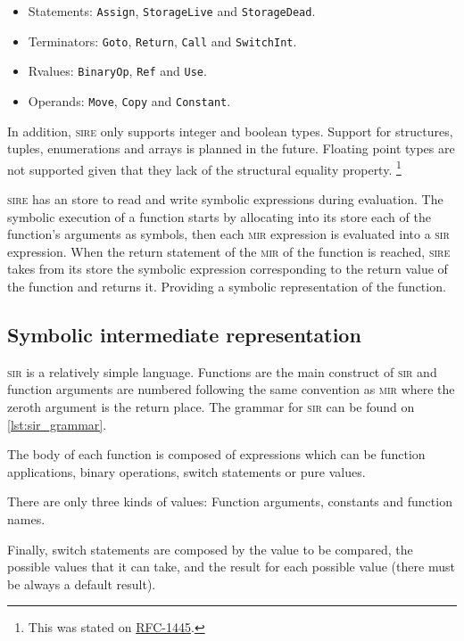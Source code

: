 \begin{itemize}
    \item Statements: \texttt{Assign}, \texttt{StorageLive} and \texttt{StorageDead}.
    \item Terminators: \texttt{Goto}, \texttt{Return}, \texttt{Call} and \texttt{SwitchInt}.
    \item Rvalues: \texttt{BinaryOp}, \texttt{Ref} and \texttt{Use}.
    \item Operands: \texttt{Move}, \texttt{Copy} and \texttt{Constant}.
\end{itemize}

In addition, \textsc{sire} only supports integer and boolean types. Support for
structures, tuples, enumerations and arrays is planned in the future. Floating
point types are not supported given that they lack of the structural equality
property. \footnote{This was stated on
\href{https://github.com/rust-lang/rfcs/blob/master/text/1445-restrict-constants-in-patterns.md}{RFC-1445}.}

\textsc{sire} has an store to read and write symbolic expressions during
evaluation. The symbolic execution of a function starts by allocating into its
store each of the function's arguments as symbols, then each \textsc{mir}
expression is evaluated into a \textsc{sir} expression. When the return
statement of the \textsc{mir} of the function is reached, \textsc{sire} takes
from its store the symbolic expression corresponding to the return value of the
function and returns it. Providing a symbolic representation of the function. 


\subsection{Symbolic intermediate representation}

\textsc{sir} is a relatively simple language. Functions are the main construct
of \textsc{sir} and function arguments are numbered following the same
convention as \textsc{mir} where the zeroth argument is the return place.  The
grammar for \textsc{sir} can be found on \ref{lst:sir_grammar}.

The body of each function is composed of expressions which can be function
applications, binary operations, switch statements or pure values. 

There are only three kinds of values: Function arguments, constants and
function names. 

Finally, switch statements are composed by the value to be compared, the
possible values that it can take, and the result for each possible value (there
must be always a default result). 


